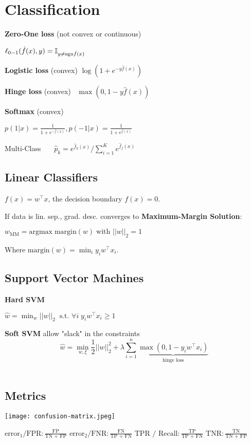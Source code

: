 \section*{Classification}

\textbf{Zero-One loss} (not convex or continuous)

\qquad \qquad $\ell_{0-1}(\hat{f}(x), y) = \mathbb{I}_{y \neq \text{sgn} \hat{f}(x)}$

\textbf{Logistic loss} (convex) \quad $\log(1 + e^{-y \hat{f}(x)})$

\textbf{Hinge loss} (convex) \quad \ $\max(0, 1-y \hat{f}(x))$

\textbf{Softmax} (convex)

\qquad $p(1 | x) = \frac{1}{1 + e^{- \hat{f}(x)}}, p(-1 | x) = \frac{1}{1 + e^{\hat{f}(x)}}$

Multi-Class \ \ \ $\hat{p}_k = e^{\hat{f}_k(x)} / \sum_{i=1}^K e^{\hat{f}_j(x)}$

\subsection*{Linear Classifiers}

$f(x) = w^\top x$, the decision boundary $f(x) = 0$. \smallskip

If data is lin. sep., grad. desc. converges to \textbf{Maximum-Margin Solution}: 

\quad $w_\text{MM} = \text{argmax} \; \text{margin} (w) \; \text{with } ||w||_2 = 1$

Where $\text{margin} (w) = \min_i y_i w^\top x_i$.
 
\subsection*{Support Vector Machines}
\textbf{Hard SVM}

\qquad $\hat{w} = \min_w ||w||_2 \; \; \text{s.t. } \forall i \;y_i w^\top x_i \geq 1$
 
\textbf{Soft SVM} \quad allow "slack" in the constraints
$$\hat{w} = \min_{w, \xi} \frac{1}{2} ||w||_2^2 + \lambda \sum_{i=1}^n \underbrace{\max (0, 1 - y_i w^\top x_i)}_{\text{hinge loss}}$$ \\[-23pt]

\subsection*{Metrics} 

\begin{multicols*}{2}
	\begin{center}
		\texttt{[image: confusion-matrix.jpeg]}
	\end{center}
	
	$\text{error}_1 / \text{FPR}: \frac{\text{FP}}{\text{TN + FP}}$
	$\text{error}_2 / \text{FNR}: \frac{\text{FN}}{\text{TP + FN}}$
	$\text{TPR / Recall}: \frac{\text{TP}}{\text{TP + FN}}$
	$\text{TNR}: \frac{\text{TN}}{\text{TN + FP}}$
\end{multicols*}

